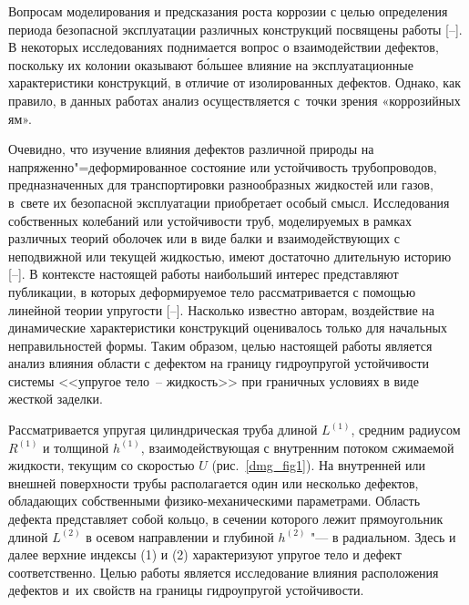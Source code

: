 Вопросам моделирования и предсказания роста коррозии с целью определения периода безопасной эксплуатации различных конструкций посвящены работы [--]. В некоторых исследованиях \cite{01_Li,03_Khalajestani,07_Benjamin} поднимается вопрос о взаимодействии дефектов, поскольку их колонии оказывают б\'{о}льшее влияние на эксплуатационные характеристики конструкций, в отличие от изолированных дефектов. Однако, как правило, в данных работах анализ осуществляется с~точки зрения «коррозийных ям».



Очевидно, что изучение влияния дефектов различной природы на напряженно"=деформированное состояние или устойчивость трубопроводов, предназначенных для транспортировки разнообразных жидкостей или газов, в~свете их безопасной эксплуатации приобретает особый смысл. Исследования собственных колебаний или устойчивости труб, моделируемых в рамках различных теорий оболочек или в виде балки и взаимодействующих с неподвижной или текущей жидкостью, имеют достаточно длительную историю [--]. В контексте настоящей работы наибольший интерес представляют публикации, в которых деформируемое тело рассматривается с помощью линейной теории упругости [--]. Насколько известно авторам, воздействие на динамические характеристики конструкций оценивалось только для начальных неправильностей формы. Таким образом, целью настоящей работы является анализ влияния области с дефектом на границу гидроупругой устойчивости системы <<упругое тело~-- жидкость>> при граничных условиях в виде жесткой заделки.



\smallskip




Рассматривается упругая цилиндрическая труба длиной $L^{(1)}$, средним радиусом $R^{(1)}$ и толщиной $h^{(1)}$, взаимодействующая с внутренним потоком сжимаемой жидкости, текущим со скоростью $U$ (рис.~\ref{dmg_fig1}). На внутренней или внешней поверхности трубы располагается один или несколько дефектов, обладающих собственными физико-механическими параметрами. Область дефекта представляет собой кольцо, в сечении которого лежит прямоугольник длиной $L^{(2)}$ в осевом направлении и глубиной $h^{(2)}$ "--- в радиальном. Здесь и далее верхние индексы (1) и (2) характеризуют упругое тело и дефект соответственно. Целью работы является исследование влияния расположения дефектов и~их свойств на границы гидроупругой устойчивости.



